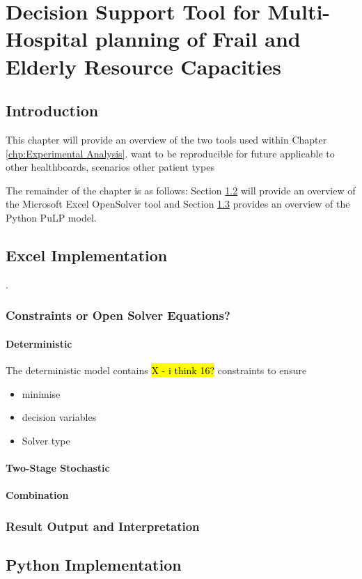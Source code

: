 \documentclass[../thesis.tex]{subfiles}
\begin{document}
\chapter{Decision Support Tool for Multi-Hospital planning of Frail and Elderly Resource Capacities}

\section{Introduction}
This chapter will provide an overview of the two tools used within Chapter \ref{chp:Experimental Analysis}.
want to be reproducible for future
applicable to other healthboards, scenarios
other patient types

The remainder of the chapter is as follows: Section \ref{sec:excelimp} will provide an overview of the Microsoft Excel OpenSolver tool and Section \ref{sec:pythonimpl} provides an overview of the Python PuLP model.


\section{Excel Implementation}\label{sec:excelimp}.

\subsection{}
\subsection{Constraints or Open Solver Equations?}
\subsubsection{Deterministic}
The deterministic model contains \hl{X - i think 16?} constraints to ensure

\begin{itemize}
    \item minimise
    \item decision variables
    \item Solver type
\end{itemize}
\subsubsection{Two-Stage Stochastic}
\subsubsection{Combination}

\subsection{Result Output and Interpretation}

\section{Python Implementation}\label{sec:pythonimpl}
\end{document}
